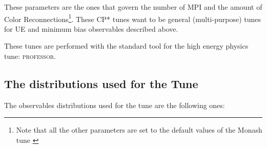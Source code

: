 \noindent These parameters are the ones that govern the number of MPI and the amount of Color Reconnections\footnote{Note that all the other parameters are set to the default values of the Monash tune \cite{Monash}}. These CP* tunes want to be general (multi-purpose) tunes for UE and minimum bias observables described above.

These tunes are performed with the standard tool for the  high energy physics tune: \textsc{professor}. 



\subsection{The distributions used for the Tune}
\label{sec:Thedistributionsused}

The observables distributions used for the tune are the following ones:


